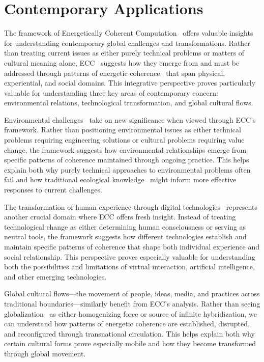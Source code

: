 \section{Contemporary Applications}

The framework of Energetically Coherent Computation~ offers valuable insights for understanding contemporary global challenges and transformations. Rather than treating current issues as either purely technical problems or matters of cultural meaning alone, ECC~ suggests how they emerge from and must be addressed through patterns of energetic coherence~ that span physical, experiential, and social domains. This integrative perspective proves particularly valuable for understanding three key areas of contemporary concern: environmental relations, technological transformation, and global cultural flows.

Environmental challenges~ take on new significance when viewed through ECC's framework. Rather than positioning environmental issues as either technical problems requiring engineering solutions or cultural problems requiring value change, the framework suggests how environmental relationships emerge from specific patterns of coherence maintained through ongoing practice. This helps explain both why purely technical approaches to environmental problems often fail and how traditional ecological knowledge~ might inform more effective responses to current challenges.

The transformation of human experience through digital technologies~ represents another crucial domain where ECC offers fresh insight. Instead of treating technological change as either determining human consciousness or serving as neutral tools, the framework suggests how different technologies establish and maintain specific patterns of coherence that shape both individual experience and social relationship. This perspective proves especially valuable for understanding both the possibilities and limitations of virtual interaction, artificial intelligence, and other emerging technologies.

Global cultural flows---the movement of people, ideas, media, and practices across traditional boundaries---similarly benefit from ECC's analysis. Rather than seeing globalization~ as either homogenizing force or source of infinite hybridization, we can understand how patterns of energetic coherence are established, disrupted, and reconfigured through transnational circulation. This helps explain both why certain cultural forms prove especially mobile and how they become transformed through global movement.

